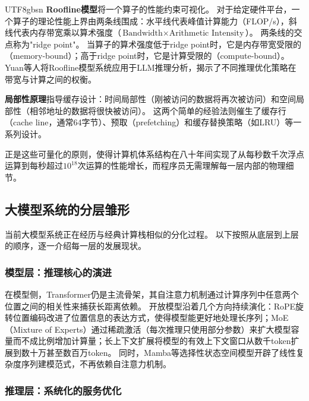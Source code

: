 \documentclass[11pt,a4paper]{article}
\begin{document}
\begin{CJK*}{UTF8}{gbsn}
\textbf{Roofline模型}将一个算子的性能约束可视化\cite{hennessy2017quantitative}。
对于给定硬件平台，一个算子的理论性能上界由两条线围成：水平线代表峰值计算能力（FLOP/s），斜线代表内存带宽乘以算术强度（$\text{Bandwidth} \times \text{Arithmetic Intensity}$）。
两条线的交点称为"ridge point"。
当算子的算术强度低于ridge point时，它是内存带宽受限的（memory-bound）；高于ridge point时，它是计算受限的（compute-bound）。
Yuan等人将Roofline模型系统应用于LLM推理分析，揭示了不同推理优化策略在带宽与计算之间的权衡\cite{yuan2024llminference}。

\textbf{局部性原理}指导缓存设计：时间局部性（刚被访问的数据将再次被访问）和空间局部性（相邻地址的数据将很快被访问）\cite{drepper2007memory}。
这两个简单的经验法则催生了缓存行（cache line，通常64字节）、预取（prefetching）和缓存替换策略（如LRU）等一系列设计。

正是这些可量化的原则，使得计算机体系结构在八十年间实现了从每秒数千次浮点运算到每秒超过$10^{18}$次运算的性能增长，而程序员无需理解每一层内部的物理细节。

\subsection{大模型系统的分层雏形}

当前大模型系统正在经历与经典计算栈相似的分化过程。
以下按照从底层到上层的顺序，逐一介绍每一层的发展现状。

\subsubsection{模型层：推理核心的演进}

在模型侧，Transformer\cite{vaswani2017attention}仍是主流骨架，其自注意力机制通过计算序列中任意两个位置之间的相关性来捕获长距离依赖。
开放模型沿着几个方向持续演化：RoPE旋转位置编码\cite{su2021roformer}改进了位置信息的表达方式，使得模型能更好地处理长序列；MoE（Mixture of Experts）\cite{switch2022,mixtral2024}通过稀疏激活（每次推理只使用部分参数）来扩大模型容量而不成比例增加计算量；长上下文扩展\cite{yarn2024,longrope2024}将模型的有效上下文窗口从数千token扩展到数十万甚至数百万token。
同时，Mamba\cite{gu2024mamba}等选择性状态空间模型开辟了线性复杂度序列建模范式，不再依赖自注意力机制。

\subsubsection{推理层：系统化的服务优化}


\end{CJK*}
\end{document}

